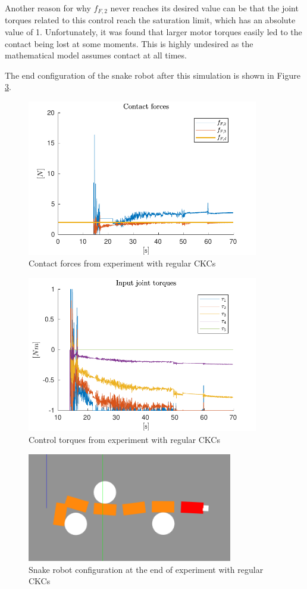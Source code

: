 Another reason for why $f_{F,2}$ never reaches its desired value can be that the joint torques related to this control reach the saturation limit, which has an absolute value of 1. Unfortunately, it was found that larger motor torques easily led to the contact being lost at some moments. This is highly undesired as the mathematical model assumes contact at all times.

The end configuration of the snake robot after this simulation is shown in Figure \ref{fig:2xf-bigJ-gazebo}.

\begin{figure}
    \centering
    \includegraphics[width=0.9\textwidth]{figures/experiments/2xf/2xf-bigJ-forces.pdf}
    \caption{Contact forces from experiment with regular CKCs}
    \label{fig:2xf-bigJ-force}
\end{figure}

\begin{figure}
    \centering
    \includegraphics[width=0.9\textwidth]{figures/experiments/2xf/2xf-bigJ-torques.pdf}
    \caption{Control torques from experiment with regular CKCs}
    \label{fig:2xf-bigJ-torque}
\end{figure}

\begin{figure}
    \centering
    \includegraphics[width=0.8\textwidth]{figures/experiments/2xf/2force-bigJ.png}
    \caption{Snake robot configuration at the end of experiment with regular CKCs}
    \label{fig:2xf-bigJ-gazebo}
\end{figure}